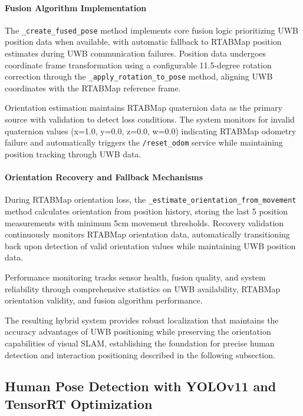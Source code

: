 \paragraph{Fusion Algorithm Implementation}

The \texttt{\_create\_fused\_pose} method implements core fusion logic prioritizing UWB position data when available, with automatic fallback to RTABMap position estimates during UWB communication failures. Position data undergoes coordinate frame transformation using a configurable 11.5-degree rotation correction through the \texttt{\_apply\_rotation\_to\_pose} method, aligning UWB coordinates with the RTABMap reference frame.

Orientation estimation maintains RTABMap quaternion data as the primary source with validation to detect loss conditions. The system monitors for invalid quaternion values (x=1.0, y=0.0, z=0.0, w=0.0) indicating RTABMap odometry failure and automatically triggers the \texttt{/reset\_odom} service while maintaining position tracking through UWB data.

\paragraph{Orientation Recovery and Fallback Mechanisms}

During RTABMap orientation loss, the \texttt{\_estimate\_orientation\_from\_movement} method calculates orientation from position history, storing the last 5 position measurements with minimum 5cm movement thresholds. Recovery validation continuously monitors RTABMap orientation data, automatically transitioning back upon detection of valid orientation values while maintaining UWB position data.

Performance monitoring tracks sensor health, fusion quality, and system reliability through comprehensive statistics on UWB availability, RTABMap orientation validity, and fusion algorithm performance.

The resulting hybrid system provides robust localization that maintains the accuracy advantages of UWB positioning while preserving the orientation capabilities of visual SLAM, establishing the foundation for precise human detection and interaction positioning described in the following subsection.



\subsection{Human Pose Detection with YOLOv11 and TensorRT Optimization}

